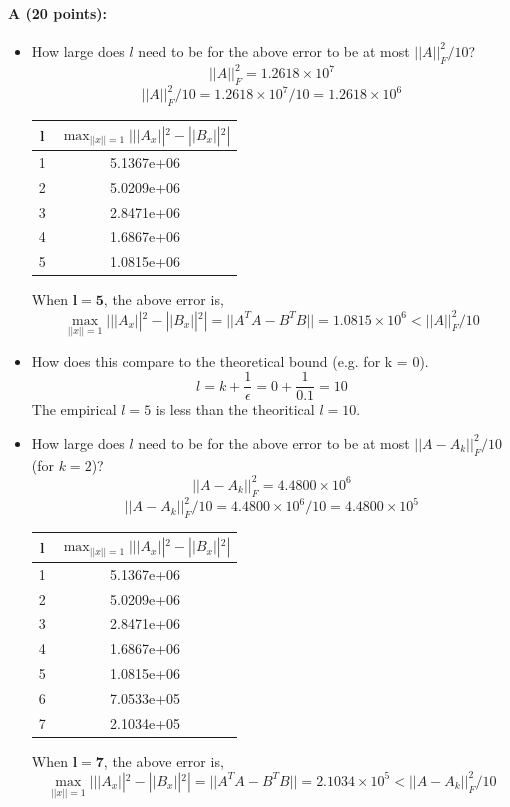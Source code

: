 \documentclass[11pt]{article}
\begin{document}
\paragraph{A (20 points):}
\begin{itemize}
\item How large does $l$ need to be for the above error to be at most $||A||_F^2/10$?
$$||A||_F^2=1.2618\times10^7$$
$$||A||_F^2/10=1.2618\times10^7/10=1.2618\times10^6$$
\begin{table}[H]
\centering
\begin{tabular}{c|c}
l & $\max_{||x||=1}|||A_x||^2-||B_x||^2|$\\
\hline
1 & 5.1367e+06\\
2 & 5.0209e+06\\
3 & 2.8471e+06\\
4 & 1.6867e+06\\
5 & 1.0815e+06\\
\end{tabular}
\end{table}
When $\mathbf{l=5}$, the above error is,
$$\max_{||x||=1}|||A_x||^2-||B_x||^2|=||A^TA-B^TB||=1.0815\times10^6<||A||_F^2/10$$
\item How does this compare to the theoretical bound (e.g. for k = 0).
$$l=k+\frac{1}{\epsilon}=0+\frac{1}{0.1}=10$$
The empirical $l=5$ is less than the theoritical $l=10$.
\item How large does $l$ need to be for the above error to be at most $||A-A_k||_F^2/10$ (for $k=2$)?
$$||A-A_k||_F^2=4.4800\times10^6$$
$$||A-A_k||_F^2/10=4.4800\times10^6/10=4.4800\times10^5$$
\begin{table}[H]
\centering
\begin{tabular}{c|c}
l & $\max_{||x||=1}|||A_x||^2-||B_x||^2|$\\
\hline
1 & 5.1367e+06\\
2 & 5.0209e+06\\
3 & 2.8471e+06\\
4 & 1.6867e+06\\
5 & 1.0815e+06\\
6 & 7.0533e+05\\
7 & 2.1034e+05\\
\end{tabular}
\end{table}
When $\mathbf{l=7}$, the above error is,
$$\max_{||x||=1}|||A_x||^2-||B_x||^2|=||A^TA-B^TB||=2.1034\times10^5<||A-A_k||_F^2/10$$
\end{itemize}
\end{document}

